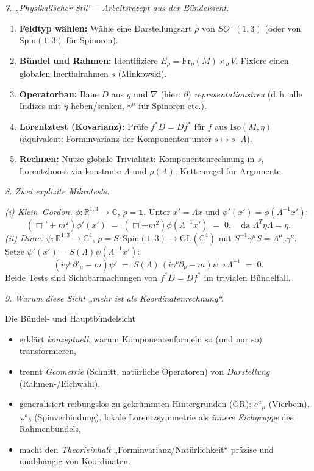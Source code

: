 \documentclass[10pt, letterpaper]{article}
\newcommand{\R}{\mathbb{R}}
\newcommand{\C}{\mathbb{C}}
\newcommand{\Iso}{\mathrm{Iso}}
\newcommand{\GL}{\mathrm{GL}}
\newcommand{\Spin}{\mathrm{Spin}}
\begin{document}
\bigskip
\emph{7. „Physikalischer Stil“ – Arbeitsrezept aus der Bündelsicht.}
\begin{enumerate}
\item \textbf{Feldtyp wählen:} Wähle eine Darstellungsart $\rho$ von $SO^+(1,3)$ 
(oder von $\Spin(1,3)$ für Spinoren).
\item \textbf{Bündel und Rahmen:} Identifiziere $E_\rho=\mathrm{Fr}_\eta(M)\times_\rho V$. 
Fixiere einen globalen Inertialrahmen $s$ (Minkowski).
\item \textbf{Operatorbau:} Baue $D$ aus $g$ und $\nabla$ (hier: $\partial$) \emph{representationstreu} 
(d.\,h. alle Indizes mit $\eta$ heben/senken, $\gamma^\mu$ für Spinoren etc.).
\item \textbf{Lorentztest (Kovarianz):} Prüfe $f^*D = D f^*$ für $f$ aus $\Iso(M,\eta)$
(äquivalent: Forminvarianz der Komponenten unter $s\mapsto s\cdot\Lambda$).
\item \textbf{Rechnen:} Nutze globale Trivialität: Komponentenrechnung in $s$,
Lorentzboost via konstante $\Lambda$ und $\rho(\Lambda)$; Kettenregel für Argumente.
\end{enumerate}

\bigskip
\emph{8. Zwei explizite Mikrotests.}

\emph{(i) Klein–Gordon.} $\phi:\R^{1,3}\to\C$, $\rho=\mathbf{1}$.
Unter $x'=\Lambda x$ und $\phi'(x')=\phi(\Lambda^{-1}x')$:
\[
(\Box'+m^2)\phi'(x') \;=\; (\Box+m^2)\phi(\Lambda^{-1}x') \;=\; 0,
\quad \text{da }\Lambda^T\eta\Lambda=\eta.
\]
\emph{(ii) Dirac.} $\psi:\R^{1,3}\to\C^4$, $\rho=S:\Spin(1,3)\to\GL(\C^4)$ mit
$S^{-1}\gamma^\mu S=\Lambda^\mu{}_\nu\gamma^\nu$.
Setze $\psi'(x')=S(\Lambda)\psi(\Lambda^{-1}x')$:
\[
(i\gamma^\mu\partial'_\mu-m)\psi' \;=\; S(\Lambda)\,(i\gamma^\nu\partial_\nu-m)\psi\;\circ\Lambda^{-1}\;=\;0.
\]
Beide Tests sind Sichtbarmachungen von $f^*D=Df^*$ im trivialen Bündelfall.

\bigskip
\emph{9. Warum diese Sicht „mehr ist als Koordinatenrechnung“.}

Die Bündel- und Hauptbündelsicht
\begin{itemize}
\item erklärt \emph{konzeptuell}, warum Komponentenformeln so (und nur so) transformieren,
\item trennt \emph{Geometrie} (Schnitt, natürliche Operatoren) von \emph{Darstellung}
(Rahmen-/Eichwahl),
\item generalisiert reibungslos zu gekrümmten Hintergründen (GR): 
$e^a{}_\mu$ (Vierbein), $\omega^a{}_b$ (Spinverbindung), 
lokale Lorentzsymmetrie als \emph{innere Eichgruppe} des Rahmenbündels,
\item macht den \emph{Theorieinhalt} „Forminvarianz/Natürlichkeit“ präzise
und unabhängig von Koordinaten.
\end{itemize}
\end{document}
